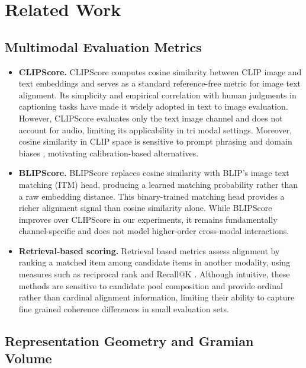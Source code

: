\documentclass[a4paper,fleqn]{cas-sc}
\begin{document}
\section{Related Work}

\subsection{Multimodal Evaluation Metrics}

\begin{itemize}

\item \textbf{CLIPScore.}
CLIPScore \citep{Hessel2021} computes cosine similarity between CLIP image and text embeddings and serves as a standard reference-free metric for image text alignment. Its simplicity and empirical correlation with human judgments in captioning tasks have made it widely adopted in text to image evaluation. However, CLIPScore evaluates only the text image channel and does not account for audio, limiting its applicability in tri modal settings. Moreover, cosine similarity in CLIP space is sensitive to prompt phrasing and domain biases \citep{Lee2023}, motivating calibration-based alternatives.

\item \textbf{BLIPScore.}
BLIPScore \citep{Li2023} replaces cosine similarity with BLIP's image text matching (ITM) head, producing a learned matching probability rather than a raw embedding distance. This binary-trained matching head provides a richer alignment signal than cosine similarity alone. While BLIPScore improves over CLIPScore in our experiments, it remains fundamentally channel-specific and does not model higher-order cross-modal interactions.

\item \textbf{Retrieval-based scoring.}
Retrieval based metrics assess alignment by ranking a matched item among candidate items in another modality, using measures such as reciprocal rank and Recall@K \citep{Radford2021}. Although intuitive, these methods are sensitive to candidate pool composition and provide ordinal rather than cardinal alignment information, limiting their ability to capture fine grained coherence differences in small evaluation sets.

\end{itemize}



\subsection{Representation Geometry and Gramian Volume}\label{sec:gramian-related}
\end{document}
